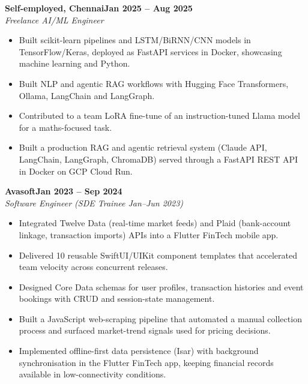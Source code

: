 \documentclass[a4paper,11pt]{article}
\newcommand{\entry}[4]{\needspace{4\baselineskip}\noindent\textbf{#1}\hfill\textbf{#2}\\ \textit{#3}\hfill\textit{#4}\par}
\begin{document}
\vspace{4pt}
\entry{Self-employed, Chennai}{Jan 2025 – Aug 2025}{Freelance AI/ML Engineer}{}
\begin{itemize}
  \item Built scikit-learn pipelines and LSTM/BiRNN/CNN models in TensorFlow/Keras, deployed as FastAPI services in Docker, showcasing machine learning and Python.
  \item Built NLP and agentic RAG workflows with Hugging Face Transformers, Ollama, LangChain and LangGraph.
  \item Contributed to a team LoRA fine-tune of an instruction-tuned Llama model for a maths-focused task.
  \item Built a production RAG and agentic retrieval system (Claude API, LangChain, LangGraph, ChromaDB) served through a FastAPI REST API in Docker on GCP Cloud Run.
\end{itemize}
\vspace{4pt}
\entry{Avasoft}{Jan 2023 – Sep 2024}{Software Engineer (SDE Trainee Jan–Jun 2023)}{}
\begin{itemize}
  \item Integrated Twelve Data (real-time market feeds) and Plaid (bank-account linkage, transaction imports) APIs into a Flutter FinTech mobile app.
  \item Delivered 10 reusable SwiftUI/UIKit component templates that accelerated team velocity across concurrent releases.
  \item Designed Core Data schemas for user profiles, transaction histories and event bookings with CRUD and session-state management.
  \item Built a JavaScript web-scraping pipeline that automated a manual collection process and surfaced market-trend signals used for pricing decisions.
  \item Implemented offline-first data persistence (Isar) with background synchronisation in the Flutter FinTech app, keeping financial records available in low-connectivity conditions.
\end{itemize}

\end{document}
